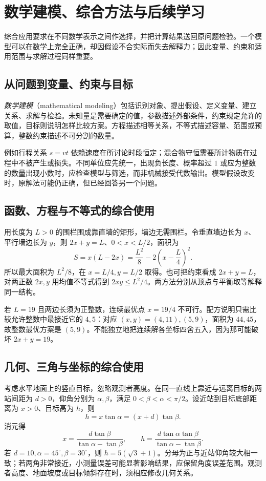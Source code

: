 \setcounter{chapter}{23} %
\chapter{数学建模、综合方法与后续学习}
\label{chap:em-modeling}
综合应用要求在不同数学表示之间作选择，并把计算结果送回原问题检验。一个模型可以在数学上完全正确，却因假设不合实际而失去解释力；因此变量、约束和适用范围与求解过程同样重要。

\section{从问题到变量、约束与目标}
\emph{数学建模}（mathematical modeling）包括识别对象、提出假设、定义变量、建立关系、求解与检验。未知量是需要确定的值，参数描述外部条件，约束规定允许的取值，目标则说明怎样比较方案。方程描述相等关系，不等式描述容量、范围或预算，整数约束描述不可分割的数量。

例如行程关系 $s=vt$ 依赖速度在所讨论时段恒定；混合物守恒需要所计物质在过程中不被产生或损失。不同单位应先统一，出现负长度、概率超过 $1$ 或应为整数的数量出现小数时，应检查模型与筛选，而非机械接受代数输出。模型假设改变时，原解法可能仍正确，但已经回答另一个问题。

\section{函数、方程与不等式的综合使用}
用长度为 $L>0$ 的围栏围成靠直墙的矩形，墙边无需围栏。令垂直墙边长为 $x$、平行墙边长为 $y$，则 $2x+y=L$、$0<x<L/2$，面积为
\[
 S=x(L-2x)=\frac{L^2}{8}-2\left(x-\frac L4\right)^2.
\]
所以最大面积为 $L^2/8$，在 $x=L/4,y=L/2$ 取得。也可把约束看成 $2x+y=L$，对两正数 $2x,y$ 用均值不等式得到 $2xy\le L^2/4$。两方法分别从顶点与平衡取等解释同一结构。

若 $L=19$ 且两边长须为正整数，连续最优点 $x=19/4$ 不可行。配方说明只需比较允许整数中最接近它的 $4,5$：对应 $(x,y)=(4,11),(5,9)$，面积为 $44,45$，故整数最优方案是 $(5,9)$。不能独立地把连续解各坐标四舍五入，因为那可能破坏 $2x+y=19$。

\section{几何、三角与坐标的综合使用}
考虑水平地面上的竖直目标，忽略观测者高度。在同一直线上靠近与远离目标的两站间距为 $d>0$，仰角分别为 $\alpha,\beta$，满足 $0<\beta<\alpha<\pi/2$。设近站到目标底部距离为 $x>0$、目标高为 $h$，则
\[
 h=x\tan\alpha=(x+d)\tan\beta.
\]
消元得
\[
 x=\frac{d\tan\beta}{\tan\alpha-\tan\beta},\qquad
 h=\frac{d\tan\alpha\tan\beta}{\tan\alpha-\tan\beta}.
\]
若 $d=10,\alpha=45^\circ,\beta=30^\circ$，则 $h=5(\sqrt3+1)$。分母为正与近站仰角较大相一致；若两角非常接近，小测量误差可能显著影响结果，应保留角度误差范围。观测者高度、地面坡度或目标倾斜存在时，须相应修改几何关系。

